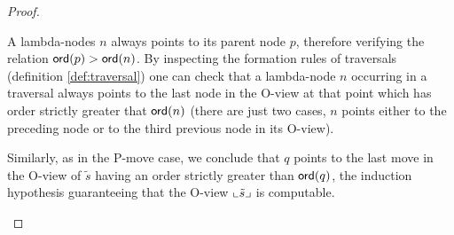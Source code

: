 \begin{proof}
\begin{itemize}
A lambda-nodes $n$ always points to its parent node $p$, therefore
verifying the relation ${\sf ord}(p) > {\sf ord}(n)$. By inspecting the
formation rules of traversals (definition \ref{def:traversal}) one
can check that a lambda-node $n$ occurring in a traversal always
points to the last node in the O-view at that point which has order
strictly greater that ${\sf ord}(n)$ (there are just two cases, $n$
points either to the preceding node or to the third previous node in
its O-view).

Similarly, as in the P-move case, we conclude that $q$ points to the last move in
the O-view of $\tilde{s}$ having an order strictly greater than ${\sf ord}(q)$,
the induction hypothesis guaranteeing that the O-view $\llcorner \tilde{s} \lrcorner$ is computable.

\end{itemize}

\end{proof}
